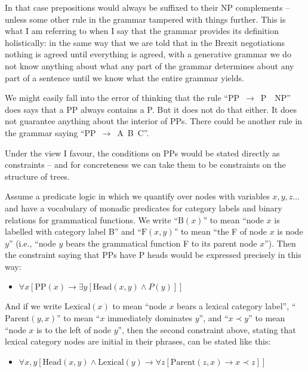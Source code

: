 \documentclass[output=paper]{langscibook}
\begin{document}
In that case prepositions would always be suffixed to their NP complements – unless some other rule in the grammar tampered with things further. This is what I am referring to when I say that the grammar provides its definition holistically: in the same way that we are told that in the Brexit negotiations nothing is agreed until everything is agreed, with a generative grammar we do not know anything about what any part of the grammar determines about any part of a sentence until we know what the entire grammar yields.

We might easily fall into the error of thinking that the rule ``PP~$\rightarrow$~P~~NP'' does says that a PP always contains a P.  But it does not do that either. It does not guarantee anything about the interior of PPs. There could be another rule in the grammar saying ``PP~$\rightarrow$~A~B~C''.

Under the view I favour, the conditions on PPs would be stated directly as constraints – and for concreteness we can take them to be constraints on the structure of trees.

Assume a predicate logic in which we quantify over nodes with variables $x, y, z\ldots$ and have a vocabulary of monadic predicates for category labels and binary relations for grammatical functions.  We write ``$\text{B}(x)$'' to mean ``node $x$ is labelled with category label B'' and ``$\text{F}(x,y)$'' to mean ``the F of node $x$ is node $y$'' (i.e., ``node $y$ bears the grammatical function F to its parent node $x$''). Then the constraint saying that PPs have P heads would be expressed precisely in this way:

\begin{itemize} 
\item[] $\forall x [ \text{PP}(x) \rightarrow                \exists y [ \text{Head}(x,y) \wedge P(y) ] ]$ 
\end{itemize} 

And if we write $\text{Lexical}(x)$ to mean ``node $x$ bears a lexical category label'', ``$\text{Parent}(y,x)$'' to mean ``$x$ immediately dominates $y$'', and ``$x \prec y$'' to mean ``node $x$ is to the left of node $y$'', then the second constraint above, stating that lexical category nodes are initial in their phrases, can be stated like this:

\begin{itemize} 
\item[] $\forall x, y [ \text{Head}(x,y) \wedge \text{Lexical}(y) \rightarrow \forall z [ \text{Parent}(z,x) \rightarrow x \prec z ] ]$ 
\end{itemize}
\end{document}
